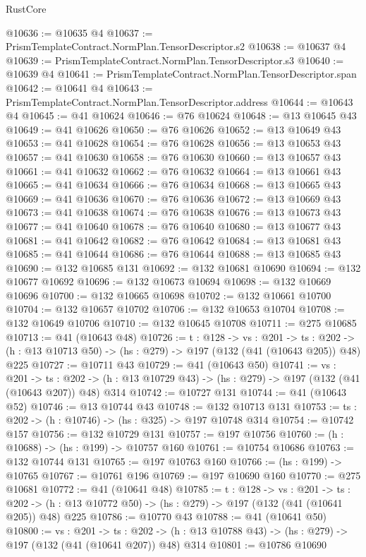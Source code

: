 \begin{lexlean}{RustCore}
\begin{coremodule}
@10636 := @10635 @4
@10637 := PrismTemplateContract.NormPlan.TensorDescriptor.s2
@10638 := @10637 @4
@10639 := PrismTemplateContract.NormPlan.TensorDescriptor.s3
@10640 := @10639 @4
@10641 := PrismTemplateContract.NormPlan.TensorDescriptor.span
@10642 := @10641 @4
@10643 := PrismTemplateContract.NormPlan.TensorDescriptor.address
@10644 := @10643 @4
@10645 := @41 @10624
@10646 := @76 @10624
@10648 := @13 @10645 @43
@10649 := @41 @10626
@10650 := @76 @10626
@10652 := @13 @10649 @43
@10653 := @41 @10628
@10654 := @76 @10628
@10656 := @13 @10653 @43
@10657 := @41 @10630
@10658 := @76 @10630
@10660 := @13 @10657 @43
@10661 := @41 @10632
@10662 := @76 @10632
@10664 := @13 @10661 @43
@10665 := @41 @10634
@10666 := @76 @10634
@10668 := @13 @10665 @43
@10669 := @41 @10636
@10670 := @76 @10636
@10672 := @13 @10669 @43
@10673 := @41 @10638
@10674 := @76 @10638
@10676 := @13 @10673 @43
@10677 := @41 @10640
@10678 := @76 @10640
@10680 := @13 @10677 @43
@10681 := @41 @10642
@10682 := @76 @10642
@10684 := @13 @10681 @43
@10685 := @41 @10644
@10686 := @76 @10644
@10688 := @13 @10685 @43
@10690 := @132 @10685 @131
@10692 := @132 @10681 @10690
@10694 := @132 @10677 @10692
@10696 := @132 @10673 @10694
@10698 := @132 @10669 @10696
@10700 := @132 @10665 @10698
@10702 := @132 @10661 @10700
@10704 := @132 @10657 @10702
@10706 := @132 @10653 @10704
@10708 := @132 @10649 @10706
@10710 := @132 @10645 @10708
@10711 := @275 @10685
@10713 := @41 (@10643 @48)
@10726 := {t : @128} ->
  {vs : @201} ->
  {ts : @202} -> (h : @13 @10713 @50) -> (hs : @279) -> @197 (@132 (@41 (@10643 @205)) @48) @225
@10727 := @10711 @43
@10729 := @41 (@10643 @50)
@10741 := {vs : @201} ->
  {ts : @202} -> (h : @13 @10729 @43) -> (hs : @279) -> @197 (@132 (@41 (@10643 @207)) @48) @314
@10742 := @10727 @131
@10744 := @41 (@10643 @52)
@10746 := @13 @10744 @43
@10748 := @132 @10713 @131
@10753 := {ts : @202} -> (h : @10746) -> (hs : @325) -> @197 @10748 @314
@10754 := @10742 @157
@10756 := @132 @10729 @131
@10757 := @197 @10756
@10760 := (h : @10688) -> (hs : @199) -> @10757 @160
@10761 := @10754 @10686
@10763 := @132 @10744 @131
@10765 := @197 @10763 @160
@10766 := (hs : @199) -> @10765
@10767 := @10761 @196
@10769 := @197 @10690 @160
@10770 := @275 @10681
@10772 := @41 (@10641 @48)
@10785 := {t : @128} ->
  {vs : @201} ->
  {ts : @202} -> (h : @13 @10772 @50) -> (hs : @279) -> @197 (@132 (@41 (@10641 @205)) @48) @225
@10786 := @10770 @43
@10788 := @41 (@10641 @50)
@10800 := {vs : @201} ->
  {ts : @202} -> (h : @13 @10788 @43) -> (hs : @279) -> @197 (@132 (@41 (@10641 @207)) @48) @314
@10801 := @10786 @10690

\end{coremodule}
\end{lexlean}
